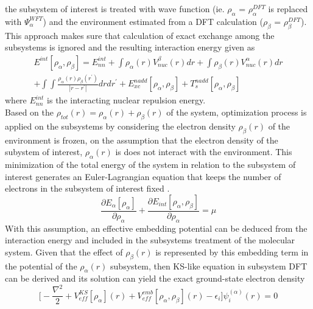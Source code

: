 \documentclass[a4paper,11pt]{report}
\begin{document}
the subsystem of interest is treated with wave function (ie. $\rho_{\alpha}$ = $\rho_{\alpha}^{DFT}$ is replaced 
with $\Psi_{\alpha}^{WFT}$) and the environment estimated  from a DFT calculation ($\rho_{\beta}$ = $\rho_{\beta}^{DFT}$).
This approach makes sure that calculation of exact exchange among the subsystems is ignored \citep{gomes2008calculation} and the resulting interaction energy
given as
\begin{equation}\label{intera}
\begin{split}
E^{int}[\rho_{\alpha}, \rho_{\beta}] = E_{nn}^{int} + \int\rho_{\alpha}(r)V^{\beta}_{nuc}(r)dr + \int\rho_{\beta}(r)V^{\alpha}_{nuc}(r)dr\\
+ \int\int\frac{\rho_{\alpha}(r)\rho_{\beta}(r^{'})}{|r-r^{'}|}drdr^{'} + E_{xc}^{nadd}[\rho_{\alpha}, \rho_{\beta}] + T_{s}^{nadd}[\rho_{\alpha}, \rho_{\beta}]
\end{split}
\end{equation}
where $E_{nn}^{int}$ is the interacting nuclear repulsion energy.\\
Based on the $\rho_{tot}(r)=\rho_{\alpha}(r) +\rho_{\beta}(r)$ of the system, optimization process is applied on the subsystems by considering 
the electron density $\rho_{\beta}(r)$ 
of the environment is frozen, on the assumption that the electron density of the subystem of interest, $\rho_{\alpha}(r)$ is does not interact 
with the environment. This minimization of the total energy of the system in relation to the subsystem of interest generates an 
Euler-Lagrangian equation that keeps the number of electrons in the subsystem of interest fixed \citep{hofener2012molecular}.%
\begin{equation}\label{inter}
\frac{\partial E_{\alpha}[\rho_{\alpha}]}{\partial\rho_{\alpha}} + \frac{\partial E_{int}[\rho_{\alpha},\rho_{\beta}]}{\partial\rho_{\alpha}} =\mu
\end{equation}
With this assumption, an effective embedding potential 
can be deduced from the interaction energy and included in the subsystems treatment of the molecular system. 
Given that the effect of $\rho_{\beta}(r)$ is represented by this embedding term in 
the potential of the $\rho_{\alpha}(r)$ subsystem, then KS-like equation in subsystem DFT can be derived and its solution can yield the 
exact ground-state electron density \citep{wesolowski1993frozen}
\begin{equation}\label{ns3}
\bigg[-\frac{\nabla^{2}}{2} + V_{eff}^{KS}[\rho_{\alpha}](r) + V_{eff}^{emb}[\rho_{\alpha}, \rho_{\beta}](r) - \epsilon_{i}\bigg]\psi_{i}^{(\alpha)}(r) = 0 
\end{equation}
\end{document}
